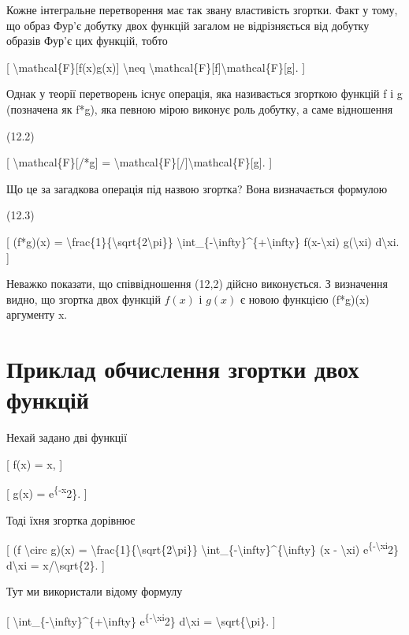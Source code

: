 \documentclass[
]{article}
\begin{document}
Кожне інтегральне перетворення має так звану властивість згортки. Факт у
тому, що образ Фур'є добутку двох функцій загалом не відрізняється від
добутку образів Фур'є цих функцій, тобто

{[} \textbackslash mathcal\{F\}{[}f(x)g(x){]} \textbackslash neq
\textbackslash mathcal\{F\}{[}f{]}\textbackslash mathcal\{F\}{[}g{]}.
{]}

Однак у теорії перетворень існує операція, яка називається згорткою
функцій f і g (позначена як f*g), яка певною мірою виконує роль добутку,
а саме відношення

(12.2)

{[} \textbackslash mathcal\{F\}{[}/*g{]} =
\textbackslash mathcal\{F\}{[}/{]}\textbackslash mathcal\{F\}{[}g{]}.
{]}

Що це за загадкова операція під назвою згортка? Вона визначається
формулою

(12.3)

{[} (f*g)(x) =
\textbackslash frac\{1\}\{\textbackslash sqrt\{2\textbackslash pi\}\}
\textbackslash int\_\{-\textbackslash infty\}\^{}\{+\textbackslash infty\}
f(x-\textbackslash xi) g(\textbackslash xi) d\textbackslash xi. {]}

Неважко показати, що співвідношення (12,2) дійсно виконується. З
визначення видно, що згортка двох функцій \(f(x)\) і \(g(x)\) є новою
функцією (f*g)(x) аргументу x.

\section{Приклад обчислення згортки двох
функцій}\label{ux43fux440ux438ux43aux43bux430ux434-ux43eux431ux447ux438ux441ux43bux435ux43dux43dux44f-ux437ux433ux43eux440ux442ux43aux438-ux434ux432ux43eux445-ux444ux443ux43dux43aux446ux456ux439}

Нехай задано дві функції

{[} f(x) = x, {]}

{[} g(x) = e\textsuperscript{\{-x}2\}. {]}

Тоді їхня згортка дорівнює

{[} (f \textbackslash circ g)(x) =
\textbackslash frac\{1\}\{\textbackslash sqrt\{2\textbackslash pi\}\}
\textbackslash int\_\{-\textbackslash infty\}\^{}\{\textbackslash infty\}
(x - \textbackslash xi) e\textsuperscript{\{-\textbackslash xi}2\}
d\textbackslash xi = x/\textbackslash sqrt\{2\}. {]}

Тут ми використали відому формулу

{[}
\textbackslash int\_\{-\textbackslash infty\}\^{}\{+\textbackslash infty\}
e\textsuperscript{\{-\textbackslash xi}2\} d\textbackslash xi =
\textbackslash sqrt\{\textbackslash pi\}. {]}
\end{document}
